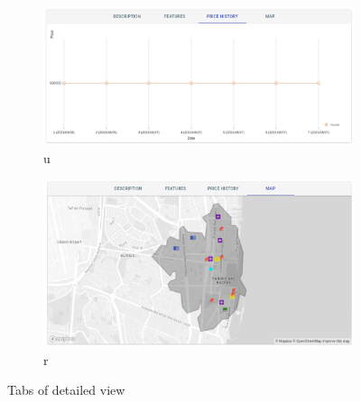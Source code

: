 \begin{figure}[H]
    \centering
    \begin{subfigure}[b]{0.49\textwidth}
        \centering
        \includegraphics[width=1\linewidth]{Chapters/img/frontend/DetailedPriceHistory.png}
        \caption{u}
        \label{fig:detailedPriceHistory}
     \end{subfigure}
     \hfill
     \begin{subfigure}[b]{0.49\textwidth}
        \centering
        \includegraphics[width=1\linewidth]{Chapters/img/frontend/DetailedIsochrone.png}
        \caption{r}
        \label{fig:detailedIsochrone}
     \end{subfigure}
     \caption{Tabs of detailed view}
\end{figure}

